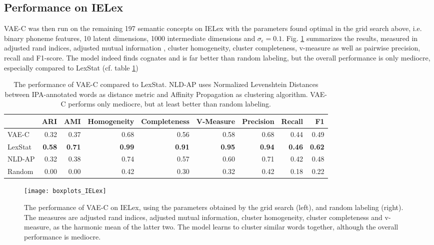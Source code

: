 \documentclass[6pt]{article}
\begin{document}
\subsection{Performance on IELex}

VAE-C was then run on the remaining 197 semantic concepts on IELex with the parameters found optimal in the grid search above, i.e. binary phoneme features, 10 latent dimensions, 1000 intermediate dimensions and $\sigma_{\epsilon}= 0.1$. Fig. \ref{fig:boxplots_IELex} summarizes the results, measured in adjusted rand indices, adjusted mutual information \citep{vinh2010information}, cluster homogeneity, cluster completeness, v-measure \citep{rosenberg2007v} as well as pairwise precision, recall and F1-score.
The model indeed finds cognates and is far better than random labeling, but the overall performance is only mediocre, especially compared to LexStat (cf. table \ref{table:model_comparison})

\begin{table}
\begin{tabular}{l | rrrrrrrr}
\toprule
{} &       ARI &       AMI &         Homogeneity &        Completeness &         V-Measure &Precision&Recall&F1 \\  \hline
\midrule
VAE-C &  0.32 &  0.37 &  0.68 &  0.56 &  0.58 &  0.68 &  0.44 &  0.49 \\ 
LexStat & \textbf{0.58} & \textbf{0.71} & \textbf{0.99} & \textbf{0.91} &  \textbf{0.95} & \textbf{0.94} & \textbf{0.46} &  \textbf{0.62} \\
NLD-AP &  0.32 & 0.38 & 0.74 &0.57 & 0.60 & 0.71 & 0.42 & 0.48 \\
Random &  0.00 &  0.00 &  0.42 &  0.30 &  0.32 &  0.42 &  0.18 &  0.22 \\
\bottomrule
\end{tabular}
\caption{The performance of VAE-C compared to LexStat. NLD-AP uses Normalized Levenshtein Distances between IPA-annotated words as distance metric and Affinity Propagation as clustering algorithm. VAE-C performs only mediocre, but at least better than random labeling.}
\label{table:model_comparison} 
\end{table}

 \begin{figure}[h!] 
     \texttt{[image: boxplots\_IELex]} 
     \caption{The performance of VAE-C on IELex, using the parameters obtained by the grid search (left), and random labeling (right). The measures are adjusted rand indices, adjusted mutual information, cluster homogeneity, cluster completeness and v-measure, as the harmonic mean of the latter two. The model learns to cluster similar words together, although the overall performance is mediocre.}
    \label{fig:boxplots_IELex} 
\end{figure}
\end{document}
